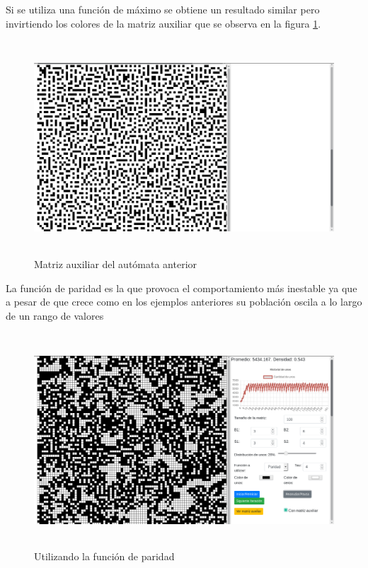 \documentclass[12pt, titlepage]{article}
\begin{document}
Si se utiliza una función de máximo se obtiene un resultado similar pero invirtiendo los colores de la matriz auxiliar que se observa en la figura \ref{fig:3634-min-aux}.

\begin{figure}[H]
\begin{center}
 \includegraphics[width=15cm, height=8cm]{./img/3634-min-aux.png}
 \caption{Matriz auxiliar del autómata anterior}
 \label{fig:3634-min-aux}
\end{center}
\end{figure}
La función de paridad es la que provoca el comportamiento más inestable ya que a pesar de que crece como en los ejemplos anteriores su población oscila a lo largo de un rango de valores 
\begin{figure}[H]
\begin{center}
 \includegraphics[width=15cm, height=8cm]{./img/3634-paridad.png}
 \caption{Utilizando la función de paridad}
 \label{fig:3634-paridad}
\end{center}
\end{figure}
\end{document}

